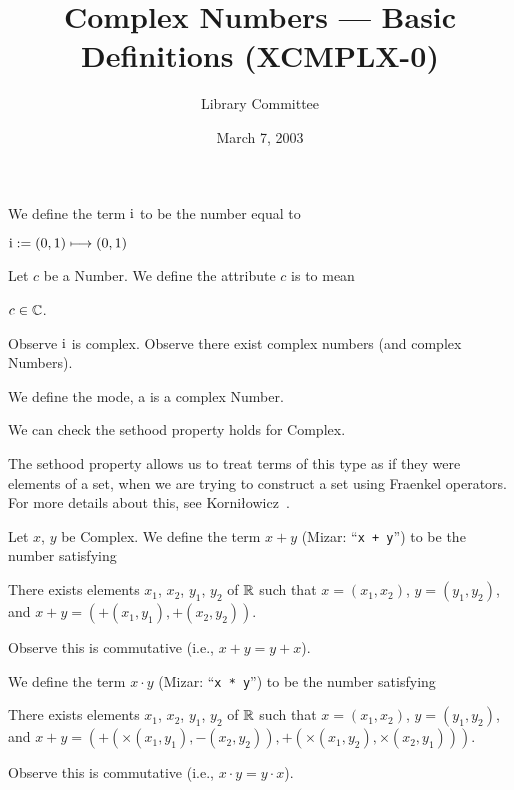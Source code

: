 \documentclass{article}
\title{Complex Numbers --- Basic Definitions (XCMPLX-0)}
\author{Library Committee}
\date{March 7, 2003}
\begin{document}
\maketitle

\begin{definition}
We define the term $\mathrm{i}$ to be the number equal to
\begin{defn}
\item $\mathrm{i} := (0,1)\longmapsto(0,1)$
\end{defn}
Let $c$ be a Number.
We define the attribute $c$ is  to mean
\begin{defn}
\item $c\in\mathbb{C}$.
\end{defn}
\end{definition}

Observe $\mathrm{i}$ is complex. Observe there exist complex numbers (and
complex Numbers).

\begin{definition}
We define the mode, a  is a complex Number.
\end{definition}

We can check the sethood property holds for Complex.

\begin{remark}%
The sethood property allows us to treat terms of this type as if they
were elements of a set, when we are trying to construct a set using
Fraenkel operators. For more details about this, see Korni{\l}owicz~\cite{kornilowicz:sethood}.
\end{remark}

\skipdefn

\begin{definition}
Let $x$, $y$ be Complex.
We define the term $x + y$ (Mizar: ``\verb#x + y#'') to be the number satisfying
\begin{defn}[start=4]
\item There exists elements $x_{1}$, $x_{2}$, $y_{1}$, $y_{2}$ of $\mathbb{R}$
  such that $x=(x_{1},x_{2})$, $y=(y_{1},y_{2})$, and $x+y=(+(x_{1},y_{1}),+(x_{2},y_{2}))$.
\end{defn}
Observe this is commutative (i.e., $x+y=y+x$).

We define the term $x\cdot y$ (Mizar: ``\verb#x * y#'') to be the number
satisfying
\begin{defn}
\item There exists elements $x_{1}$, $x_{2}$, $y_{1}$, $y_{2}$ of $\mathbb{R}$
  such that $x=(x_{1},x_{2})$, $y=(y_{1},y_{2})$, and $x+y=(+(\times(x_{1},y_{1}),-(x_{2},y_{2})),+(\times(x_{1},y_{2}),\times(x_{2},y_{1})))$.
\end{defn}
Observe this is commutative (i.e., $x\cdot y=y\cdot x$).
\end{definition}
\end{document}
